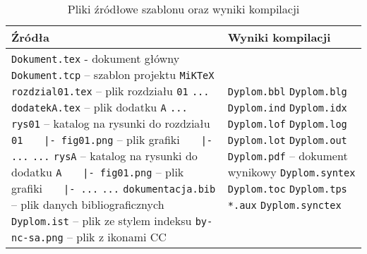 \begin{table}[htb]
\centering\small
\caption{Pliki źródłowe szablonu oraz wyniki kompilacji}
\label{tab:szablon}
\begin{tabularx}{\linewidth}{|p{.55\linewidth}|X|}\hline
Źródła & Wyniki kompilacji \\ \hline\hline
\verb?Dokument.tex? - dokument główny\newline
\verb?Dokument.tcp? -- szablon projektu \texttt{MiKTeX}\newline
\verb?rozdzial01.tex? -- plik rozdziału \texttt{01}\newline
\verb?...?\newline
\verb?dodatekA.tex? -- plik dodatku \texttt{A}\newline
\verb?...?\newline
\verb?rys01? -- katalog na rysunki do rozdziału \texttt{01}\newline
\verb?   |- fig01.png? -- plik grafiki\newline
\verb?   |- ...?\newline
\verb?...?\newline
\verb?rysA? -- katalog na rysunki do dodatku \texttt{A}\newline
\verb?   |- fig01.png? -- plik grafiki\newline
\verb?   |- ...?\newline
\verb?...?\newline
\verb?dokumentacja.bib? -- plik danych bibliograficznych\newline
\verb?Dyplom.ist? -- plik ze stylem indeksu\newline
\verb?by-nc-sa.png? -- plik z ikonami CC\newline
 &
\verb?Dyplom.bbl?\newline
\verb?Dyplom.blg?\newline
\verb?Dyplom.ind?\newline
\verb?Dyplom.idx?\newline
\verb?Dyplom.lof?\newline
\verb?Dyplom.log?\newline
\verb?Dyplom.lot?\newline
\verb?Dyplom.out?\newline
\verb?Dyplom.pdf? -- dokument wynikowy\newline
\verb?Dyplom.syntex?\newline
\verb?Dyplom.toc?\newline
\verb?Dyplom.tps?\newline
\verb?*.aux?\newline 
\verb?Dyplom.synctex?\newline\\
\hline
\end{tabularx}
\end{table}


